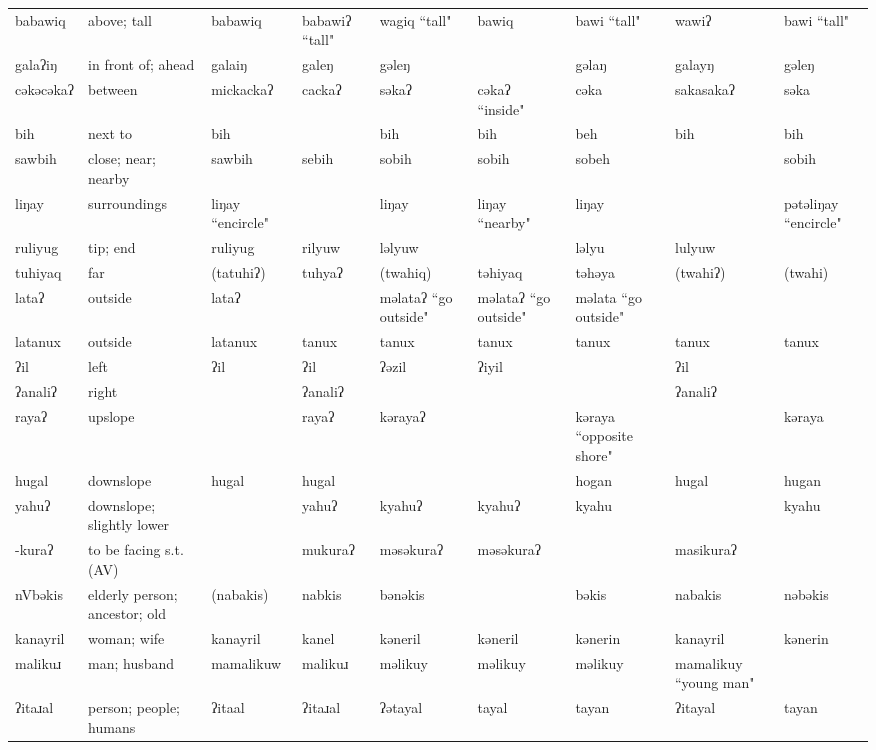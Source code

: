 \begin{landscape}
\begin{longtable}{*{9}{>{\raggedright\arraybackslash}p{}}}
\text{*}babawiq & above; tall & babawiq & babawiʔ ``tall" & wagiq ``tall" & bawiq & bawi ``tall" & wawiʔ & bawi ``tall"\\
\text{*}galaʔiŋ & in front of; ahead & galaiŋ & galeŋ & gəleŋ &  & gəlaŋ & galayŋ & gəleŋ\\
\text{*}cəkəcəkaʔ & between & mickackaʔ & cackaʔ & səkaʔ & cəkaʔ ``inside" & cəka & sakasakaʔ & səka\\
\text{*}bih & next to & bih &  & bih & bih & beh & bih & bih\\
\text{*}sawbih & close; near; nearby & sawbih & sebih & sobih & sobih & sobeh &  & sobih\\
\text{*}liŋay & surroundings & liŋay ``encircle" &  & liŋay & liŋay ``nearby" & liŋay &  & pətəliŋay ``encircle"\\
\text{*}ruliyug & tip; end & ruliyug & rilyuw & ləlyuw &  & ləlyu & lulyuw & \\
\text{*}tuhiyaq & far & (tatuhiʔ) & tuhyaʔ & (twahiq) & təhiyaq & təhəya & (twahiʔ) & (twahi)\\
\text{*}lataʔ & outside & lataʔ &  & məlataʔ ``go outside" & məlataʔ ``go outside" & məlata ``go outside" &  & \\
\text{*}latanux & outside & latanux & tanux & tanux & tanux & tanux & tanux & tanux\\
\text{*}ʔil & left & ʔil & ʔil & ʔəzil & ʔiyil &  & ʔil & \\
\text{*}ʔanaliʔ & right &  & ʔanaliʔ &  &  &  & ʔanaliʔ & \\
\text{*}rayaʔ & upslope &  & rayaʔ & kərayaʔ &  & kəraya ``opposite shore" &  & kəraya\\
\text{*}hugal & downslope & hugal & hugal &  &  & hogan & hugal & hugan\\
\text{*}yahuʔ & downslope; slightly lower &  & yahuʔ & kyahuʔ & kyahuʔ & kyahu &  & kyahu\\
\text{*}-kuraʔ & to be facing s.t. (AV) &  & mukuraʔ & məsəkuraʔ & məsəkuraʔ &  & masikuraʔ & \\
\text{*}nVbəkis & elderly person; ancestor; old & (nabakis) & nabkis & bənəkis &  & bəkis & nabakis & nəbəkis\\
\text{*}kanayril & woman; wife & kanayril & kanel & kəneril & kəneril & kənerin & kanayril & kənerin\\
\text{*}malikuɹ & man; husband & mamalikuw & malikuɹ & məlikuy & məlikuy & məlikuy & mamalikuy ``young man" & \\
\text{*}ʔitaɹal & person; people; humans & ʔitaal & ʔitaɹal & ʔətayal & tayal & tayan & ʔitayal & tayan\\

\end{longtable}
\end{landscape}
